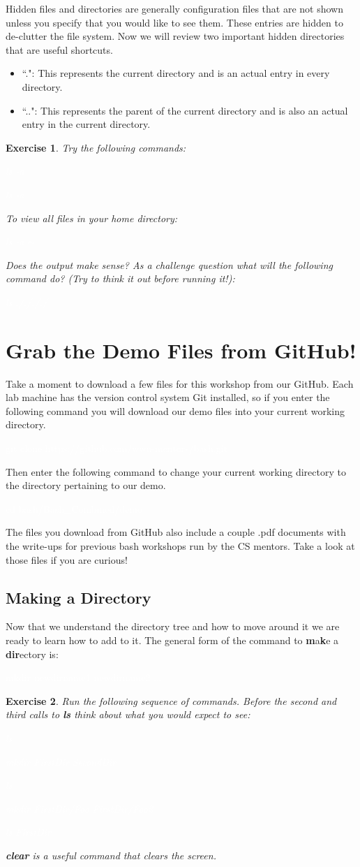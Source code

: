 \documentclass[oneside]{book}
\newcommand{\commandline}[1]{\begin{center} \colorbox{Dark}{\textcolor{white}{#1}} \end{center}}
\newtheorem{ex}{Exercise}[chapter]
\begin{document}
Hidden files and directories are generally configuration files that are not shown unless you specify that you would like to see them. These entries are hidden to de-clutter the file system. Now we will review two important hidden directories that are useful shortcuts.

\begin{itemize}
	\item ``.": This represents the current directory and is an actual entry in every directory.
	\item ``..": This represents the parent of the current directory and is also an actual entry in the current directory.
\end{itemize}
\vspace{0.3cm}
\begin{ex}
	Try the following commands:
	\commandline{ls -a}
	\commandline{ls -a .}
To view all files in your home directory:
	\commandline{ls -a $\sim$}

Does the output make sense? As a challenge question what will the following command do? (Try to think it out before running it!):
	\commandline{ls ././././}
\end{ex}

\section{Grab the Demo Files from GitHub!}
Take a moment to download a few files for this workshop from our GitHub. Each lab machine has the version control system Git installed, so if you enter the following command you will download our demo files into your current working directory.

\commandline{git clone https://github.com/wwu-mentors/bash.git}
Then enter the following command to change your current working directory to the directory pertaining to our demo.
\commandline{cd bash/Bash\_Combined/demo}
The files you download from GitHub also include a couple .pdf documents with the write-ups for previous bash workshops run by the CS mentors. Take a look at those files if you are curious!

\subsection{Making a Directory}
Now that we understand the directory tree and how to move around it we are ready to learn how to add to it. The general form of the command to \textbf{m}a\textbf{k}e a \textbf{dir}ectory is:
\commandline{mkdir newdirname1 newdirname2 ...}
\begin{ex}
	Run the following sequence of commands. Before the second and third calls to \textbf{ls} think about what you would expect to see:
\commandline{ls}
\commandline{mkdir FirstDir SecondDir}
\commandline{ls}
\commandline{mkdir FirstDir/Foo FirstDir/Foo2}
\commandline{ls FirstDir}
\textbf{clear} is a useful command that clears the screen.
\end{ex}
\end{document}
